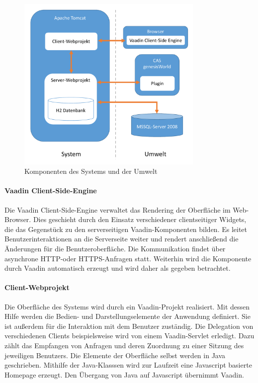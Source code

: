 \begin{figure}[htbp]
\centering
  \includegraphics[width=0.8\textwidth, width=0.8\textwidth]{pics/Konzept_architektur.pdf}
\caption{Komponenten des Systems und der Umwelt}
\label{konzept_architektur}
\end{figure} 

\paragraph{Vaadin Client-Side-Engine}

Die Vaadin Client-Side-Engine verwaltet das Rendering der Oberfläche im Web-Browser.  Dies geschieht durch den Einsatz verschiedener clientseitiger Widgets, die das Gegenstück zu den serverseitigen Vaadin-Komponenten bilden. Es leitet Benutzerinteraktionen an die Serverseite weiter und rendert anschließend die Änderungen für die Benutzeroberfläche. Die Kommunikation findet über asynchrone HTTP-oder HTTPS-Anfragen statt. Weiterhin wird die Komponente durch Vaadin automatisch erzeugt und wird daher als gegeben betrachtet.

\paragraph{Client-Webprojekt}

Die Oberfläche des Systems wird durch ein Vaadin-Projekt realisiert. Mit dessen Hilfe werden die Bedien- und Darstellungselemente der Anwendung definiert. Sie ist außerdem für die Interaktion mit dem Benutzer zuständig. Die Delegation von verschiedenen Clients beispielsweise wird von einem Vaadin-Servlet erledigt. Dazu zählt das Empfangen von Anfragen und deren Zuordnung zu einer Sitzung des jeweiligen Benutzers. Die Elemente der Oberfläche selbst werden in Java geschrieben. Mithilfe der Java-Klasssen wird zur Laufzeit eine Javascript basierte Homepage erzeugt. Den Übergang von Java auf Javascript übernimmt Vaadin.

